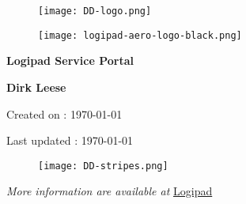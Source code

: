 
        \begin{titlepage}
            \centering
            \vspace*{0mm} %
            \begin{figure}[!h]
                \vspace*{-20mm}
                \texttt{[image: DD-logo.png]}
            \end{figure}
            \vspace{30mm} %
            \begin{figure}[!h]
                \centering
                \texttt{[image: logipad-aero-logo-black.png]}
            \end{figure}

            \vspace{10mm} 
            \textbf{\Huge {Logipad Service Portal}}

            \vspace{30mm}
            \Large \textbf{{Dirk Leese}}

            \small Created on : \today

            \vspace*{0mm}
            \small  Last updated : \MonthYearFormat\today
            
            \vspace{50mm}
            \begin{figure}[!h]
                \hspace*{-20mm}
                \texttt{[image: DD-stripes.png]}
            \end{figure}
            \vfill
            \small \textit{More information are available at }{\href{http://www.logipad.aero}{Logipad}}
        \end{titlepage}

        \tableofcontents
        \listoffigures
        \listoftables
        \clearpage
